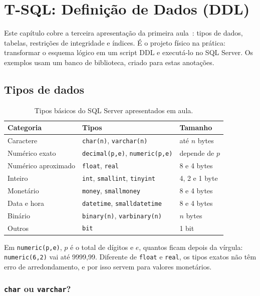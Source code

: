 \setchapterpreamble[u]{\margintoc}
\chapter{T-SQL: Definição de Dados (DDL)}

Este capítulo cobre a terceira apresentação da primeira
aula~\cite{BaiocoCET615}: tipos de dados, tabelas, restrições de
integridade e índices. É o projeto físico na prática: transformar o
esquema lógico em um script DDL e executá-lo no SQL Server. Os exemplos
usam um banco de biblioteca, criado para estas anotações.

\section{Tipos de dados}

\begin{table}[h]
	\begin{tabular}{lll}
		\toprule
		Categoria & Tipos & Tamanho \\
		\midrule
		Caractere & \texttt{char(n)}, \texttt{varchar(n)} & até $n$ bytes \\
		Numérico exato & \texttt{decimal(p,e)}, \texttt{numeric(p,e)} & depende de $p$ \\
		Numérico aproximado & \texttt{float}, \texttt{real} & 8 e 4 bytes \\
		Inteiro & \texttt{int}, \texttt{smallint}, \texttt{tinyint} & 4, 2 e 1 byte \\
		Monetário & \texttt{money}, \texttt{smallmoney} & 8 e 4 bytes \\
		Data e hora & \texttt{datetime}, \texttt{smalldatetime} & 8 e 4 bytes \\
		Binário & \texttt{binary(n)}, \texttt{varbinary(n)} & $n$ bytes \\
		Outros & \texttt{bit} & 1 bit \\
		\bottomrule
	\end{tabular}
	\caption{Tipos básicos do SQL Server apresentados em aula.}
\end{table}

Em \texttt{numeric(p,e)}, $p$ é o total de dígitos e $e$, quantos ficam
depois da vírgula: \texttt{numeric(6,2)} vai até 9999,99. Diferente de
\texttt{float} e \texttt{real}, os tipos exatos não têm erro de
arredondamento, e por isso servem para valores monetários.

\subsection{\texttt{char} ou \texttt{varchar}?}

